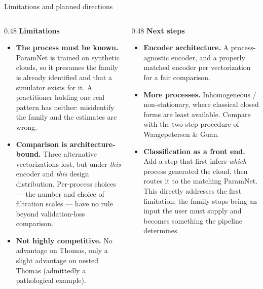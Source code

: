 \documentclass[aspectratio=169,10pt]{beamer}
\begin{document}
\begin{frame}{Limitations and planned directions}
\begin{columns}[T,onlytextwidth]
\begin{column}{0.48\textwidth}
\textbf{Limitations}\\[3pt]
{\footnotesize
\begin{itemize}\setlength\itemsep{6pt}
  \item \textbf{The process must be known.} ParamNet is trained on
        synthetic clouds, so it presumes the family is already identified
        and that a simulator exists for it.
        A practitioner holding one real pattern has neither: misidentify the
        family and the estimates are wrong.
  \item \textbf{Comparison is architecture-bound.} Three alternative
        vectorizations lost, but under \emph{this} encoder and \emph{this}
        design distribution. Per-process choices --- the number and choice of
        filtration scales --- have no rule beyond validation-loss comparison.
  \item \textbf{Not highly competitive.} No advantage on Thomas, only a slight
        advantage on nested Thomas (admittedly a pathological example).
\end{itemize}}
\end{column}
\begin{column}{0.48\textwidth}
\textbf{Next steps}\\[3pt]
{\footnotesize
\begin{itemize}\setlength\itemsep{6pt}
  \item \textbf{Encoder architecture.} A process-agnostic encoder, and a
        properly matched encoder per vectorization for a fair comparison.
  \item \textbf{More processes.} Inhomogeneous / non-stationary, where classical
        closed forms are least available. Compare with the two-step procedure of
        Waagepetersen \& Guan.
  \item \textbf{Classification as a front end.} Add a step that first infers
        \emph{which} process generated the cloud, then routes it to the matching
        ParamNet. This directly addresses the first limitation: the family stops
        being an input the user must supply and becomes something the pipeline
        determines.
\end{itemize}}
\end{column}
\end{columns}
\end{frame}
\end{document}
